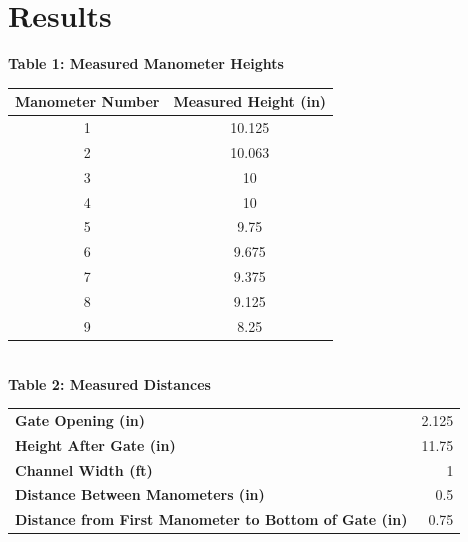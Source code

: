\documentclass{article}
\begin{document}
\section{Results} 
\begin{center}
{\large{\bf Table 1: Measured Manometer Heights\\}}
\vspace{3mm}
    \begin{tabular}{|cc|}
        \hline
        \textbf{Manometer Number} & \textbf{Measured Height (in)} \\\hline
        1                         & 10.125                         \\
        2                         & 10.063                            \\
        3                         & 10                          \\
        4                         & 10                          \\
        5                         & 9.75                         \\
        6                         & 9.675                           \\
        7                         & 9.375                            \\
        8                         & 9.125                             \\
        9                         & 8.25                          \\\hline
    \end{tabular}
    \vspace{10mm}
    {\large{\bf \\Table 2: Measured Distances\\}}
    \vspace{3mm}
    \begin{tabular}{|l|r|} 
        \hline
        \textbf{Gate Opening (in)}                                    & 2.125  \\
        \textbf{Height After Gate (in)}                               & 11.75  \\
        \textbf{Channel Width (ft)}                                   & 1      \\
        \textbf{Distance Between Manometers (in)}                     & 0.5    \\
        \textbf{Distance from First Manometer to Bottom of Gate (in)} & 0.75   \\
        \hline
    \end{tabular}
\end{center}
\newpage
\end{document}
